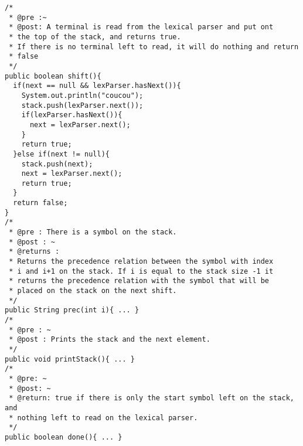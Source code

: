   {\tiny  \begin{verbatim}
/*
 * @pre :~
 * @post: A terminal is read from the lexical parser and put ont
 * the top of the stack, and returns true.
 * If there is no terminal left to read, it will do nothing and return 
 * false
 */
public boolean shift(){
  if(next == null && lexParser.hasNext()){
    System.out.println("coucou");
    stack.push(lexParser.next());
    if(lexParser.hasNext()){
      next = lexParser.next();
    }
    return true;
  }else if(next != null){
    stack.push(next);
    next = lexParser.next();
    return true;
  }
  return false;
}
/*
 * @pre : There is a symbol on the stack.
 * @post : ~
 * @returns : 
 * Returns the precedence relation between the symbol with index
 * i and i+1 on the stack. If i is equal to the stack size -1 it
 * returns the precedence relation with the symbol that will be
 * placed on the stack on the next shift.
 */
public String prec(int i){ ... }
/*
 * @pre : ~
 * @post : Prints the stack and the next element. 
 */
public void printStack(){ ... }
/* 
 * @pre: ~
 * @post: ~
 * @return: true if there is only the start symbol left on the stack, and 
 * nothing left to read on the lexical parser.
 */
public boolean done(){ ... }


\end{verbatim}}
